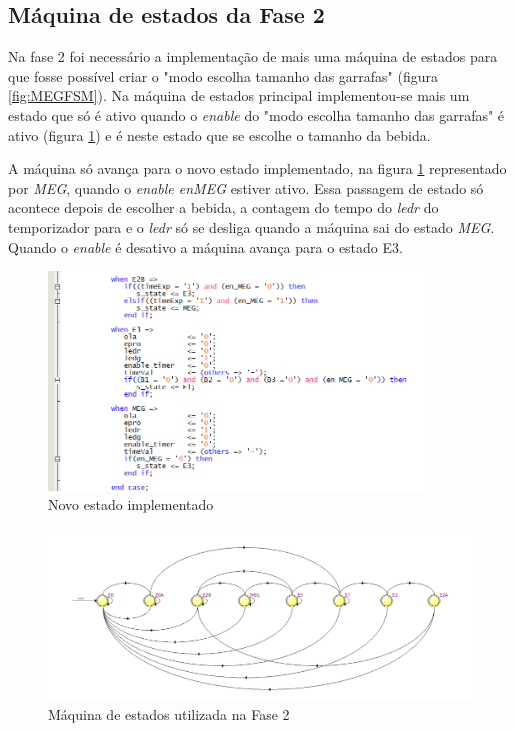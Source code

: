 \documentclass{report}
\begin{document}
\subsection{Máquina de estados da Fase 2}
Na fase 2 foi necessário a implementação de mais uma máquina de estados para que fosse possível criar o "modo escolha tamanho das garrafas" (figura \ref{fig:MEGFSM}). Na máquina de estados principal implementou-se mais um estado que só é ativo quando o \textit{enable} do "modo escolha tamanho das garrafas" é ativo (figura \ref{fig:FSMFase2}) e é neste estado que se escolhe o tamanho da bebida. 

A máquina só avança para o novo estado implementado, na figura \ref{fig:FSMFase2} representado por \textit{MEG}, quando o \textit{enable en\textunderscore MEG} estiver ativo. Essa passagem de estado só acontece depois de escolher a bebida, a contagem do tempo do \textit{ledr} do temporizador para e o \textit{ledr} só se desliga quando a máquina sai do estado \textit{MEG}. Quando o \textit{enable} é desativo a máquina avança para o estado E3.

\begin{figure}[H]
    \centering
    \includegraphics[width = 10cm]{Fase2FSM.png}
    \caption{Novo estado implementado}
    \label{fig:FSMFase2}
\end{figure}

\begin{figure}[H]
    \centering
    \includegraphics[width = \textwidth]{FSM2.png}
    \caption{Máquina de estados utilizada na Fase 2}
    \label{fig:Fase2FSM}
\end{figure}
\end{document}
